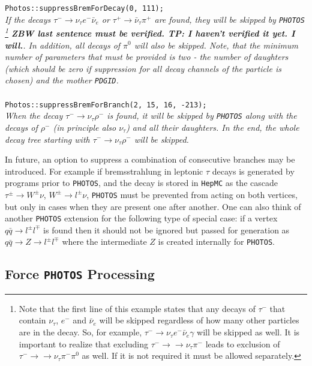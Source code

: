 \documentclass[]{Photos_interface_design}
\begin{document}
\begin{itemize}
{\tt Photos::suppressBremForDecay(0, 111); } \\
\emph{If the decays $\tau^- \rightarrow \nu_\tau e^- \bar \nu_e$ or
      $\tau^+ \rightarrow \bar \nu_\tau \pi^+$ are found, they will be skipped by {\tt PHOTOS}{%
      \footnote{Note that the first line of this example states that any decays of $\tau^-$
      that contain $\nu_\tau$, $e^-$ and $\bar \nu_e$ will be skipped regardless of how many other particles are in the decay.
      So, for example, $\tau^- \rightarrow \nu_\tau e^- \bar \nu_e \gamma$ will be skipped as well. It is important to realize that excluding 
$\tau^- \to \rightarrow \nu_\tau \pi^-$ leads to exclusion of
$\tau^- \to \rightarrow \nu_\tau \pi^-\pi^0$ as well. If it is not required it must be allowed separately.} {\bf  ZBW last sentence must be verified. TP: I haven't verified it yet. I will.}}.
	  In addition, all decays of $\pi^0$ will also be skipped. Note, that the minimum
	  number of parameters that must be provided is two - the number of daughters
	  (which should be zero if suppression for all decay channels of the particle is chosen) 
	  and the mother {\tt PDGID}.} \\ \\
{\tt Photos::suppressBremForBranch(2, 15, 16, -213); } \\
\emph{When the decay $\tau^- \rightarrow \nu_\tau \rho^-$ is found, it will be skipped by
      {\tt PHOTOS} along with the decays of   $\rho^-$ 
(in principle also $\nu_\tau$) and all
	  their daughters. In the end, the whole decay tree starting with
	  $\tau^- \rightarrow \nu_\tau \rho^-$ will be skipped.}
\end{itemize}

In future, an option to suppress a combination of consecutive branches may be introduced.
For example if bremsstrahlung in leptonic $\tau$ decays is generated by
programs prior to {\tt PHOTOS}, and the decay is stored in {\tt HepMC} as the cascade
$\tau^\pm \to W^\pm \nu$, $W^\pm \to l^\pm \nu$, {\tt PHOTOS} must
be prevented from acting on both vertices, but only in cases when they are present one after another.
One can also think of another {\tt PHOTOS} extension for the following type of special case: if a vertex $q
\bar q \to l^\pm l^\mp$ is found then it should not be ignored but
passed for generation as $q \bar q \to Z \to l^\pm l^\mp$ where
the intermediate $Z$ is created internally for {\tt PHOTOS}.

\subsection{Force {\tt PHOTOS} Processing }
\label{section:force}
\end{document}
